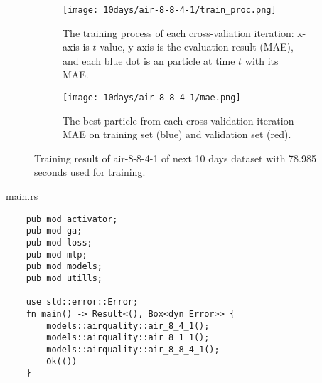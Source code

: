 \begin{figure}[htp]
    \begin{subfigure}{\textwidth}  
        \centering
        \texttt{[image: 10days/air-8-8-4-1/train\_proc.png]}
        \caption{The training process of each cross-valiation iteration: x-axis is $t$ value, y-axis is the evaluation result (MAE), 
        and each blue dot is an particle at time $t$ with its MAE.}
        \label{fig:7a}
    \end{subfigure}
    \begin{subfigure}{\textwidth}  
        \centering
        \texttt{[image: 10days/air-8-8-4-1/mae.png]}
        \caption{The best particle from each cross-validation iteration MAE on training set (blue) and validation set (red).}
        \label{fig:7b}
    \end{subfigure}
    \caption{Training result of air-8-8-4-1 of next 10 days dataset with 78.985 seconds used for training.}
    \label{fig:7}
\end{figure}
\FloatBarrier

\begin{code}
\caption{main.rs}
\begin{verbatim}  
    pub mod activator;
    pub mod ga;
    pub mod loss;
    pub mod mlp;
    pub mod models;
    pub mod utills;
    
    use std::error::Error;
    fn main() -> Result<(), Box<dyn Error>> {
        models::airquality::air_8_4_1();
        models::airquality::air_8_1_1();
        models::airquality::air_8_8_4_1();
        Ok(())
    }
\end{verbatim}
\end{code}

